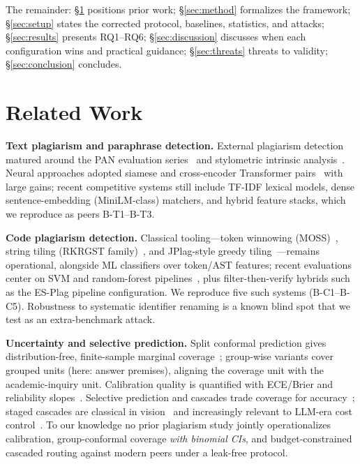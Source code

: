 \documentclass[conference]{IEEEtran}
\begin{document}
The remainder: \S\ref{sec:related} positions prior work; \S\ref{sec:method} formalizes the
framework; \S\ref{sec:setup} states the corrected protocol, baselines, statistics, and attacks;
\S\ref{sec:results} presents RQ1--RQ6; \S\ref{sec:discussion} discusses when each configuration wins
and practical guidance; \S\ref{sec:threats} threats to validity; \S\ref{sec:conclusion} concludes.

\section{Related Work}
\label{sec:related}

\textbf{Text plagiarism and paraphrase detection.} External plagiarism detection matured around the
PAN evaluation series~\cite{potthast2010} and stylometric intrinsic analysis~\cite{stamatatos2011}.
Neural approaches adopted siamese and cross-encoder Transformer pairs~\cite{devlin2018,humeau2019,reimers2019}
with large gains; recent competitive systems still include TF-IDF lexical models, dense
sentence-embedding (MiniLM-class) matchers, and hybrid feature stacks, which we reproduce as
peers B-T1--B-T3.

\textbf{Code plagiarism detection.} Classical tooling---token winnowing (MOSS)~\cite{schleimer2003},
string tiling (RKRGST family)~\cite{wise1996}, and JPlag-style greedy tiling~\cite{prechelt2002}---remains
operational, alongside ML classifiers over token/AST features; recent evaluations center on SVM and
random-forest pipelines~\cite{gandhi2024,mehsen2024}, plus filter-then-verify hybrids such as the
ES-Plag pipeline configuration. We reproduce five such systems (B-C1--B-C5). Robustness to systematic
identifier renaming is a known blind spot that we test as an extra-benchmark attack.

\textbf{Uncertainty and selective prediction.} Split conformal prediction gives distribution-free,
finite-sample marginal coverage~\cite{vovk2005,angelopoulos2021,romano2020}; group-wise variants
cover grouped units (here: answer premises), aligning the coverage unit with the academic-inquiry unit.
Calibration quality is quantified with ECE/Brier and reliability slopes~\cite{platt1999,zadrozny2002,guo2017}.
Selective prediction and cascades trade coverage for accuracy~\cite{chow1970,geifman2017}; staged
cascades are classical in vision~\cite{viola2001} and increasingly relevant to LLM-era cost
control~\cite{wang2017}. To our knowledge no prior plagiarism study jointly operationalizes
calibration, group-conformal coverage \emph{with binomial CIs}, and budget-constrained cascaded
routing against modern peers under a leak-free protocol.
\end{document}
